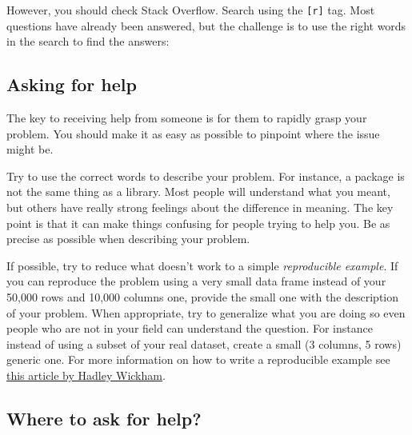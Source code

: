 \documentclass[]{book}
\begin{document}
However, you should check Stack Overflow. Search using the \texttt{{[}r{]}} tag. Most questions have already been answered, but the challenge is to use the right words in the search to find the answers: \href{http://stackoverflow.com/questions/tagged/r}{}

\hypertarget{asking-for-help}{%
\subsection*{Asking for help}\label{asking-for-help}}

The key to receiving help from someone is for them to rapidly grasp your problem. You should make it as easy as possible to pinpoint where the issue might be.

Try to use the correct words to describe your problem. For instance, a package is not the same thing as a library. Most people will understand what you meant, but others have really strong feelings about the difference in meaning. The key point is that it can make things confusing for people trying to help you. Be as precise as possible when describing your problem.

If possible, try to reduce what doesn't work to a simple \emph{reproducible example}. If you can reproduce the problem using a very small data frame instead of your 50,000 rows and 10,000 columns one, provide the small one with the description of your problem. When appropriate, try to generalize what you are doing so even people who are not in your field can understand the question. For instance instead of using a subset of your real dataset, create a small (3 columns, 5 rows) generic one. For more information on how to write a reproducible example see \href{\%22http://adv-r.had.co.nz/Reproducibility.html\%22}{this article by Hadley Wickham}.

\hypertarget{where-to-ask-for-help}{%
\subsection*{Where to ask for help?}\label{where-to-ask-for-help}}
\end{document}
